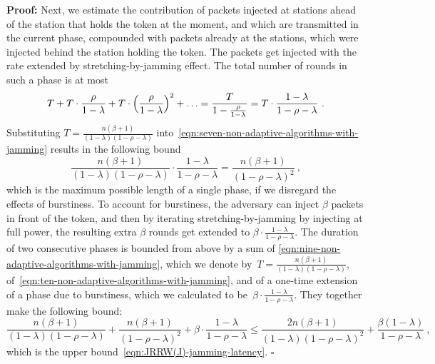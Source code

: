 \documentclass[11pt]{article}
\newcommand{\qed}{\hfill $\square$}
\newenvironment{proof}{\noindent\textbf{Proof: }}{\qed \smallbreak}
\begin{document}
\begin{proof}
Next, we estimate the contribution of packets injected at stations ahead of the station that holds the token at the moment, and which are transmitted in the current phase, compounded with packets already at the stations,  which were injected behind the station holding the token.
The packets get injected with the rate extended by stretching-by-jamming effect.
The total number of rounds in such a phase is at most
\begin{equation}
\label{eqn:seven-non-adaptive-algorithms-with-jamming}
T + T\cdot \frac{\rho}{1-\lambda}+ T \cdot \Bigl(\frac{\rho}{1-\lambda}\Bigr)^2  +\ldots 
=  
\frac{T}{1-\frac{\rho}{1-\lambda}}
=
T\cdot\frac{1-\lambda}{1-\rho-\lambda}
\ .
\end{equation}
Substituting $T=\frac{n(\beta+1)}{(1-\lambda)(1-\rho-\lambda)}$ into~\eqref{eqn:seven-non-adaptive-algorithms-with-jamming} results in the following bound
\begin{equation}
\label{eqn:ten-non-adaptive-algorithms-with-jamming}
\frac{n(\beta+1)}{(1-\lambda)(1-\rho-\lambda)}\cdot \frac{1-\lambda}{1-\rho-\lambda}
=
\frac{n(\beta+1)}{(1-\rho-\lambda)^2}
\ ,
\end{equation}
which is the maximum possible length of a single phase, if we disregard the effects of burstiness.
To account for burstiness, the adversary can inject $\beta$ packets in front of the token, and then by iterating stretching-by-jamming by injecting at full power, the resulting extra $\beta$ rounds get extended to $\beta \cdot \frac{1-\lambda}{1-\rho-\lambda}$.
The duration of two consecutive phases is bounded from above by a sum of \eqref{eqn:nine-non-adaptive-algorithms-with-jamming}, which we denote by~$T=\frac{n(\beta+1)}{(1-\lambda)(1-\rho-\lambda)}$, of~\eqref{eqn:ten-non-adaptive-algorithms-with-jamming}, and of a one-time extension of a phase due to burstiness, which we calculated to be~$\beta \cdot \frac{1-\lambda}{1-\rho-\lambda}$.
They together make the following bound:
\[
\frac{n(\beta+1)}{(1-\lambda)(1-\rho-\lambda)} + \frac{n(\beta+1)}{(1-\rho-\lambda)^2} + \beta \cdot \frac{1-\lambda}{1-\rho-\lambda}
\le
\frac{2n(\beta+1)}{(1-\lambda)(1-\rho-\lambda)^2} + \frac{\beta(1-\lambda)}{1-\rho-\lambda}
\ ,
\]
which is the upper bound~\eqref{eqn:JRRW(J)-jamming-latency}.
\end{proof}
\end{document}
